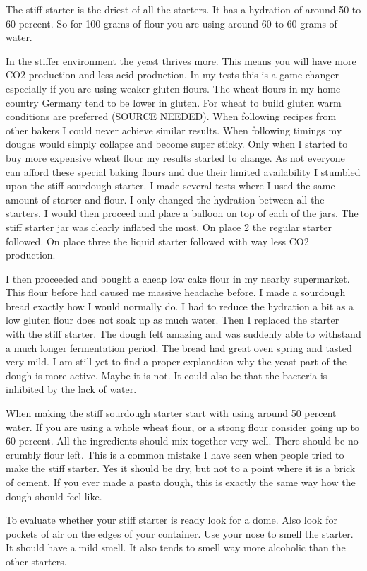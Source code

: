 The stiff starter is the driest of all the starters. It has a hydration of
around 50 to 60 percent. So for 100 grams of flour you are using around 60 to
60 grams of water.

In the stiffer environment the yeast thrives more. This means you will have
more CO2 production and less acid production. In my tests this is a game
changer especially if you are using weaker gluten flours. The wheat flours in
my home country Germany tend to be lower in gluten. For wheat to build gluten warm conditions
are preferred (SOURCE NEEDED). When following recipes from other bakers I
could never achieve similar results. When following timings my doughs would
simply collapse and become super sticky. Only when I started to buy more
expensive wheat flour my results started to change. As not everyone can afford
these special baking flours and due their limited availability I stumbled upon the
stiff sourdough starter. I made several tests where I used the same amount of
starter and flour. I only changed the hydration between all the starters. I
would then proceed and place a balloon on top of each of the jars. The stiff
starter jar was clearly inflated the most. On place 2 the regular starter
followed. On place three the liquid starter followed with way less CO2
production.

I then proceeded and bought a cheap low cake flour in my nearby supermarket.
This flour before had caused me massive headache before. I made a sourdough bread
exactly how I would normally do. I had to reduce the hydration a bit as a low
gluten flour does not soak up as much water. Then I replaced the starter with
the stiff starter. The dough felt amazing and was suddenly able to withstand a
much longer fermentation period. The bread had great oven spring and tasted
very mild. I am still yet to find a proper explanation why the yeast part of
the dough is more active. Maybe it is not. It could also be that the bacteria
is inhibited by the lack of water.

When making the stiff sourdough starter start with using around 50 percent
water. If you are using a whole wheat flour, or a strong flour consider going
up to 60 percent. All the ingredients should mix together very well. There
should be no crumbly flour left. This is a common mistake I have seen when
people tried to make the stiff starter. Yes it should be dry, but not to a
point where it is a brick of cement. If you ever made a pasta dough, this is
exactly the same way how the dough should feel like.

To evaluate whether your stiff starter is ready look for a dome. Also look for
pockets of air on the edges of your container. Use your nose to smell the
starter. It should have a mild smell. It also tends to smell way more
alcoholic than the other starters.

